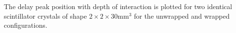 \label{fig:centroid} The delay peak position with depth of interaction is plotted for two identical scintillator crystals of shape $2\times2\times30$mm$^3$ for the unwrapped and wrapped configurations.